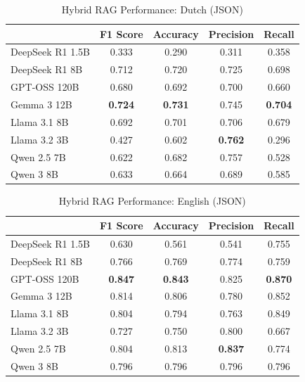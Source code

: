 
\begin{table}[!htbp]
\caption{Hybrid RAG Performance: Dutch (JSON)}
\label{tab:hybrid_dutch_json}
\begin{tabular}{lcccc}
\toprule
 & F1 Score & Accuracy & Precision & Recall \\
\midrule
DeepSeek R1 1.5B & 0.333 & 0.290 & 0.311 & 0.358 \\
DeepSeek R1 8B & 0.712 & 0.720 & 0.725 & 0.698 \\
GPT-OSS 120B & 0.680 & 0.692 & 0.700 & 0.660 \\
Gemma 3 12B & \textbf{0.724} & \textbf{0.731} & 0.745 & \textbf{0.704} \\
Llama 3.1 8B & 0.692 & 0.701 & 0.706 & 0.679 \\
Llama 3.2 3B & 0.427 & 0.602 & \textbf{0.762} & 0.296 \\
Qwen 2.5 7B & 0.622 & 0.682 & 0.757 & 0.528 \\
Qwen 3 8B & 0.633 & 0.664 & 0.689 & 0.585 \\
\bottomrule
\end{tabular}
\end{table}


\begin{table}[!htbp]
\caption{Hybrid RAG Performance: English (JSON)}
\label{tab:hybrid_english_json}
\begin{tabular}{lcccc}
\toprule
 & F1 Score & Accuracy & Precision & Recall \\
\midrule
DeepSeek R1 1.5B & 0.630 & 0.561 & 0.541 & 0.755 \\
DeepSeek R1 8B & 0.766 & 0.769 & 0.774 & 0.759 \\
GPT-OSS 120B & \textbf{0.847} & \textbf{0.843} & 0.825 & \textbf{0.870} \\
Gemma 3 12B & 0.814 & 0.806 & 0.780 & 0.852 \\
Llama 3.1 8B & 0.804 & 0.794 & 0.763 & 0.849 \\
Llama 3.2 3B & 0.727 & 0.750 & 0.800 & 0.667 \\
Qwen 2.5 7B & 0.804 & 0.813 & \textbf{0.837} & 0.774 \\
Qwen 3 8B & 0.796 & 0.796 & 0.796 & 0.796 \\
\bottomrule
\end{tabular}
\end{table}


